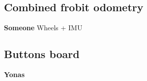 	\subsection{Combined frobit odometry} %
	\label{sub:mr_combined_frobit_odometry}
	\textbf{Someone}
	Wheels + IMU
	

	\subsection{Buttons board} %
	\label{sub:mr_buttons_board}
	\textbf{Yonas}

